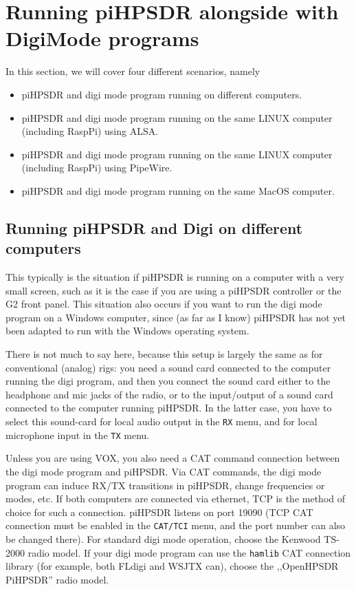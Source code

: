 \documentclass[12pt]{book}
\def\bltt#1{\texttt{\color{blue}#1}}
\def\pH{pi\-HPSDR\xspace}
\begin{document}
\chapter[\pH and digi mode programs]{Running \pH alongside with DigiMode programs}

In this section, we will cover four different scenarios, namely
\begin{itemize}
\item{\pH and digi mode program running on different computers.}
\item{\pH and digi mode program running on the same LINUX computer
(including RaspPi) using ALSA.}
\item{\pH and digi mode program running on the same LINUX computer
(including RaspPi) using PipeWire.}
\item{\pH and digi mode program running on the same MacOS computer.}
\end{itemize}



\section[\pH and Digi on different computers]{Running \pH and Digi on different computers}

This typically is the situation if \pH is running on a computer with a very small
screen, such as it is the case if you are using a \pH controller or the G2 front panel.
This situation also occurs if you want to run the digi mode program on a Windows computer,
since (as far as I know) \pH has not yet been adapted to run with the Windows operating
system.

There is not much to say here, because this setup is largely the same as for conventional
(analog) rigs: you need a sound card connected to the computer running the digi program,
and then you connect the sound card either to the headphone and mic jacks of the radio,
or to the input/output of a sound card connected to the computer running \pH. In the
latter case, you have to select this sound-card for local audio output in the \bltt{RX} menu,
and for local microphone input in the \bltt{TX} menu.

Unless you are using VOX, you also need a CAT command connection between the digi mode program
and \pH. Via CAT commands, the digi mode program can induce RX/TX transitions in \pH,
change frequencies or modes, etc. If both computers are connected via ethernet,
TCP is the method of choice for such a connection. \pH listens on port 19090 (TCP CAT
connection must be enabled in the \bltt{CAT/TCI} menu, and the port number can also
be changed there). For standard digi mode operation, choose the
Kenwood TS-2000 radio model. If your digi mode program can use the \texttt{hamlib} CAT connection
library (for example, both FLdigi and WSJTX can), choose the ,,OpenHPSDR PiHPSDR'' radio
model.
\end{document}
